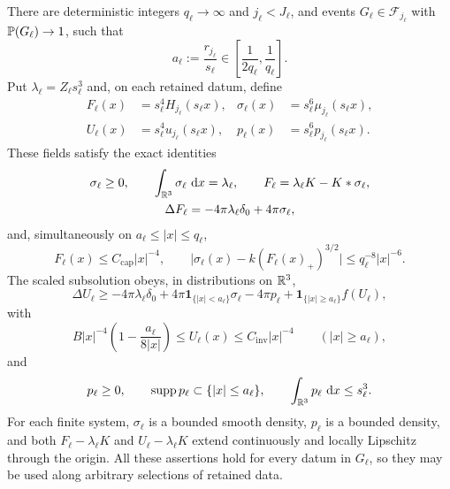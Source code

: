 \begin{proposition}
\label{scales:good}
There are deterministic integers $q_\ell\to\infty$ and $j_\ell<J_\ell$,
and events $G_\ell\in\mathcal F_{j_\ell}$ with
$\mathbb P(G_\ell)\to1$, such that
\begin{equation}
 a_\ell:=\frac{r_{j_\ell}}{s_\ell}
 \in\left[\frac1{2q_\ell},\frac1{q_\ell}\right].
 \label{scales:inner-radius}
\end{equation}
Put $\lambda_\ell=Z_\ell s_\ell^3$ and, on each retained datum, define
\begin{equation}
 \begin{aligned}
 F_\ell(x)&=s_\ell^4H_{j_\ell}(s_\ell x),&
 \sigma_\ell(x)&=s_\ell^6\mu_{j_\ell}(s_\ell x),\\
 U_\ell(x)&=s_\ell^4u_{j_\ell}(s_\ell x),&
 p_\ell(x)&=s_\ell^6p_{j_\ell}(s_\ell x).
 \end{aligned}
 \label{scales:fields}
\end{equation}
These fields satisfy the exact identities
\begin{equation}
 \begin{gathered}
 \sigma_\ell\ge0,\qquad \int_{\mathbb R^3}\sigma_\ell\,\,\mathrm d x=\lambda_\ell,
 \qquad F_\ell=\lambda_\ell K-K*\sigma_\ell,\\
 \Delta F_\ell=-4\pi\lambda_\ell\delta_0+4\pi\sigma_\ell,
 \end{gathered}
 \label{scales:mass-field}
\end{equation}
and, simultaneously on $a_\ell\le|x|\le q_\ell$,
\begin{equation}
 F_\ell(x)\le C_{\mathrm{cap}}|x|^{-4},\qquad
 \bigl|\sigma_\ell(x)-k(F_\ell(x)_+)^{3/2}\bigr|
 \le q_\ell^{-8}|x|^{-6}.
 \label{scales:band}
\end{equation}
The scaled subsolution obeys, in distributions on $\mathbb R^3$,
\begin{equation}
 \Delta U_\ell\ge
 -4\pi\lambda_\ell\delta_0
 +4\pi\mathbf1_{\{|x|<a_\ell\}}\sigma_\ell
 -4\pi p_\ell
 +\mathbf1_{\{|x|\ge a_\ell\}}f(U_\ell),
 \label{scales:invariant}
\end{equation}
with
\begin{equation}
 B|x|^{-4}\left(1-\frac{a_\ell}{8|x|}\right)
 \le U_\ell(x)\le C_{\mathrm{inv}}|x|^{-4}
 \qquad (|x|\ge a_\ell),
 \label{scales:barriers}
\end{equation}
and
\begin{equation}
 p_\ell\ge0,\qquad
 \operatorname{supp}p_\ell\subset\{|x|\le a_\ell\},\qquad
 \int_{\mathbb R^3}p_\ell\,\,\mathrm d x\le s_\ell^3.
 \label{scales:error}
\end{equation}
For each finite system, $\sigma_\ell$ is a bounded smooth density,
$p_\ell$ is a bounded density, and both
$F_\ell-\lambda_\ell K$ and $U_\ell-\lambda_\ell K$ extend continuously
and locally Lipschitz through the origin.  All these assertions hold for every
datum in $G_\ell$, so they may be used along arbitrary selections of retained
data.
\end{proposition}

